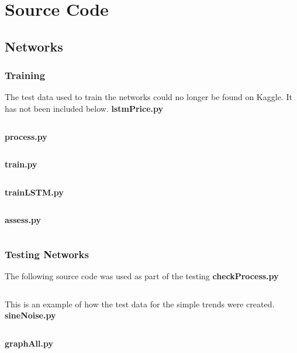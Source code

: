 \pagebreak
\section{Source Code}
    \subsection{Networks}
        \subsubsection{Training}
        The test data used to train the networks could no longer be found on Kaggle. It has not been included below.    
        \vspace{5mm}\linebreak
            \textbf{lstmPrice.py}\vspace{3mm}
            \inputminted[linenos=true, xleftmargin=2pt, tabsize=4, breaklines]{python}{../source/nets/models/lstmPrice.py}
            \pagebreak
            \textbf{process.py}\vspace{3mm}
            \inputminted[linenos=true, xleftmargin=2pt, tabsize=4, breaklines]{python}{../source/nets/process.py}
            \pagebreak
            \textbf{train.py}\vspace{3mm}
            \inputminted[linenos=true, xleftmargin=2pt, tabsize=4, breaklines]{python}{../source/nets/train.py}
            \pagebreak
            \textbf{trainLSTM.py}\vspace{3mm}
            \inputminted[linenos=true, xleftmargin=2pt, tabsize=4, breaklines]{python}{../source/nets/trainLSTM.py}
            \pagebreak
            \textbf{assess.py}\vspace{3mm}
            \inputminted[linenos=true, xleftmargin=2pt, tabsize=4, breaklines]{python}{../source/nets/assess.py}

            \pagebreak
        \subsubsection{Testing Networks}
            The following source code was used as part of the testing \vspace{5mm}\linebreak
            \textbf{checkProcess.py}
            \inputminted[linenos=true, xleftmargin=2pt, tabsize=4, breaklines]{python}{../source/nets/checkProcess.py}
            \pagebreak
            This is an example of how the test data for the simple trends were created.\vspace{5mm}\linebreak
            \textbf{sineNoise.py}
            \inputminted[linenos=true, xleftmargin=2pt, tabsize=4, breaklines]{python}{../source/nets/sineNoise.py}
            \pagebreak
            \textbf{graphAll.py}
            \inputminted[linenos=true, xleftmargin=2pt, tabsize=4, breaklines]{python}{../source/nets/graphAll.py}

